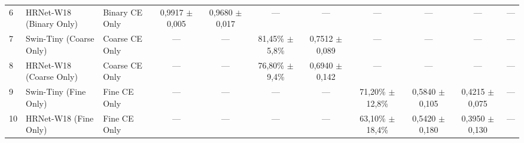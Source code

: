 \begin{table}[t]
\begin{adjustbox}{width=\textwidth}
\begin{tabular}{lllcccccccc}
6 & HRNet-W18 (Binary Only) & Binary CE Only & 0,9917 $\pm$ 0,005 & 0,9680 $\pm$ 0,017 & --- & --- & --- & --- & --- & --- \\
7 & Swin-Tiny (Coarse Only) & Coarse CE Only & --- & --- & 81,45\% $\pm$ 5,8\% & 0,7512 $\pm$ 0,089 & --- & --- & --- & --- \\
8 & HRNet-W18 (Coarse Only) & Coarse CE Only & --- & --- & 76,80\% $\pm$ 9,4\% & 0,6940 $\pm$ 0,142 & --- & --- & --- & --- \\
9 & Swin-Tiny (Fine Only) & Fine CE Only & --- & --- & --- & --- & 71,20\% $\pm$ 12,8\% & 0,5840 $\pm$ 0,105 & 0,4215 $\pm$ 0,075 & --- \\
10 & HRNet-W18 (Fine Only) & Fine CE Only & --- & --- & --- & --- & 63,10\% $\pm$ 18,4\% & 0,5420 $\pm$ 0,180 & 0,3950 $\pm$ 0,130 & --- \\
\bottomrule
\end{tabular}
\end{adjustbox}
\end{table}
